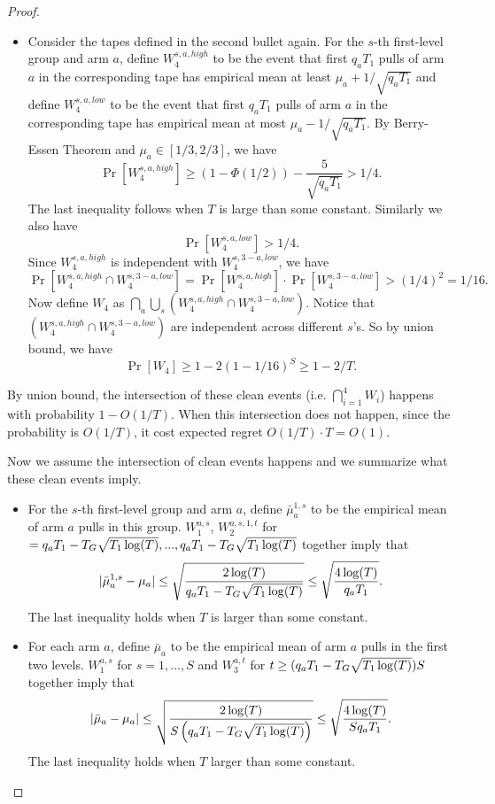 \begin{proof}
\begin{itemize}
\item Consider the tapes defined in the second bullet again. For the $s$-th first-level group and arm $a$, define $W_4^{s,a,high}$  to be the event that first $q_a T_1$ pulls of arm $a$ in the corresponding tape has empirical mean at least $\mu_a + 1/\sqrt{q_a T_1}$ and define  $W_4^{s,a,low}$  to be the event that first $q_a T_1$ pulls of arm $a$ in the corresponding tape has empirical mean at most $\mu_a - 1/\sqrt{q_a T_1}$. By Berry-Essen Theorem and $\mu_a \in [1/3,2/3]$, we have
\[
\Pr[W_4^{s,a,high}] \geq (1-\Phi(1/2)) - \frac{5}{\sqrt{q_aT_1}} > 1/4.
\]
The last inequality follows when $T$ is large than some constant.
Similarly we also have 
\[
\Pr[W_4^{s,a,low}] > 1/4.
\]
Since $W_4^{s,a,high}$ is independent with $W_4^{s,3-a,low}$, we have
\[
\Pr[W_4^{s,a,high} \cap W_4^{s,3-a,low}] =\Pr[W_4^{s,a,high}] \cdot  \Pr[W_4^{s,3-a,low}]>(1/4)^2 = 1/16.
\]
Now define $W_4$ as $\bigcap_a \bigcup_s (W_4^{s,a,high} \cap W_4^{s,3-a,low})$. Notice that $(W_4^{s,a,high} \cap W_4^{s,3-a,low})$ are independent across different $s$'s. So by union bound, we have
\[
\Pr[W_4] \geq 1- 2(1-1/16)^S \geq 1 -2 /T.
\]
\end{itemize}

By union bound, the intersection of these clean events (i.e. $\bigcap_{i=1}^4 W_i$) happens with probability $1-O(1/T)$. When this intersection does not happen, since the probability is $O(1/T)$, it cost expected regret $O(1/T) \cdot T = O(1)$. 

Now we assume the intersection of clean events happens and we summarize what these clean events imply.

\begin{itemize}
\item For the $s$-th first-level group and arm $a$, define $\bar{\mu}_a^{1,s}$ to be the empirical mean of arm $a$ pulls in this group. $W_1^{a,s}$, $W_2^{a,s,1,t}$ for $ = q_a T_1- T_G \sqrt{T_1\log(T)},...,q_a T_1- T_G \sqrt{T_1\log(T)}$ together imply that
\[
|\bar{\mu}_a^{1,s} - \mu_a| \leq \sqrt{\frac{2\log(T)}{q_a T_1- T_G \sqrt{T_1\log(T)}}} \leq \sqrt{\frac{4\log(T)}{q_a T_1}}.
\]
The last inequality holds when $T$ is larger than some constant.
\item For each arm $a$, define $\bar{\mu}_a$ to be the empirical mean of arm $a$ pulls in the first two levels. $W_1^{a,s}$ for $s=1,...,S$ and $W_3^{a,t}$ for $t \geq  (q_a T_1- T_G \sqrt{T_1\log(T)})S$ together imply that
\[
|\bar{\mu}_a - \mu_a| \leq \sqrt{\frac{2\log(T)}{S\left(q_a T_1- T_G \sqrt{T_1\log(T)}\right)}} \leq \sqrt{\frac{4\log(T)}{S q_a T_1}} .
\]
The last inequality holds when $T$ larger than some constant.


\end{itemize}
\end{proof}
